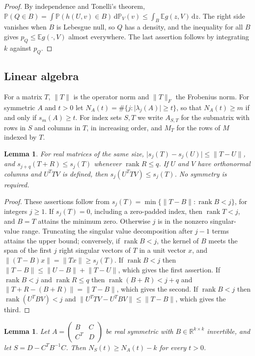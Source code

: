 \documentclass[11pt]{amsart}
\numberwithin{equation}{section}
\newtheorem{lemma}[theorem]{Lemma}
\theoremstyle{definition}
\theoremstyle{remark}
\newcommand{\R}{\mathbb R}
\newcommand{\E}{\mathbb E}
\newcommand{\PP}{\mathbb P}
\newcommand{\1}{\mathbf 1}
\newcommand{\dd}{\,\mathrm d}
\DeclareMathOperator{\rank}{rank}
\newcommand{\norm}[1]{\lVert #1\rVert}
\newcommand{\abs}[1]{\lvert #1\rvert}
\begin{document}
\begin{proof}
By independence and Tonelli's theorem, $\PP(Q\in B)=\int\PP(h(U,v)\in B)\dd\PP_V(v)\le\int_B\E g(z,V)\dd z$. The right side vanishes when $B$ is Lebesgue null, so $Q$ has a density, and the inequality for all $B$ gives $p_Q\le\E g(\cdot,V)$ almost everywhere. The last assertion follows by integrating $k$ against $p_Q$.
\end{proof}

\subsection{Linear algebra}
For a matrix $T$, $\norm T$ is the operator norm and $\norm T_F$ the Frobenius norm. For symmetric $A$ and $t>0$ let $N_A(t)=\#\{j:\abs{\lambda_j(A)}\ge t\}$, so that $N_A(t)\ge m$ if and only if $s_m(A)\ge t$. For index sets $S,T$ we write $A_{S,T}$ for the submatrix with rows in $S$ and columns in $T$, in increasing order, and $M_T$ for the rows of $M$ indexed by $T$.

\begin{lemma}\label{lem:weyl}
For real matrices of the same size, $\abs{s_j(T)-s_j(U)}\le\norm{T-U}$, and $s_{j+q}(T+R)\le s_j(T)$ whenever $\rank R\le q$. If $U$ and $V$ have orthonormal columns and $U^TTV$ is defined, then $s_j(U^TTV)\le s_j(T)$. No symmetry is required.
\end{lemma}

\begin{proof}
These assertions follow from $s_j(T)=\min\{\norm{T-B}:\rank B<j\}$, for integers $j\ge1$. If $s_j(T)=0$, including a zero-padded index, then $\rank T<j$, and $B=T$ attains the minimum zero. Otherwise $j$ is in the nonzero singular-value range. Truncating the singular value decomposition after $j-1$ terms attains the upper bound; conversely, if $\rank B<j$, the kernel of $B$ meets the span of the first $j$ right singular vectors of $T$ in a unit vector $x$, and $\norm{(T-B)x}=\norm{Tx}\ge s_j(T)$. If $\rank B<j$ then $\norm{T-B}\le\norm{U-B}+\norm{T-U}$, which gives the first assertion. If $\rank B<j$ and $\rank R\le q$ then $\rank(B+R)<j+q$ and $\norm{T+R-(B+R)}=\norm{T-B}$, which gives the second. If $\rank B<j$ then $\rank(U^TBV)<j$ and $\norm{U^TTV-U^TBV}\le\norm{T-B}$, which gives the third.
\end{proof}

\begin{lemma}\label{lem:schur}
Let $A=\begin{pmatrix}B&C\\C^T&D\end{pmatrix}$ be real symmetric with $B\in\R^{k\times k}$ invertible, and let $S=D-C^TB^{-1}C$. Then $N_S(t)\ge N_A(t)-k$ for every $t>0$.
\end{lemma}
\end{document}
